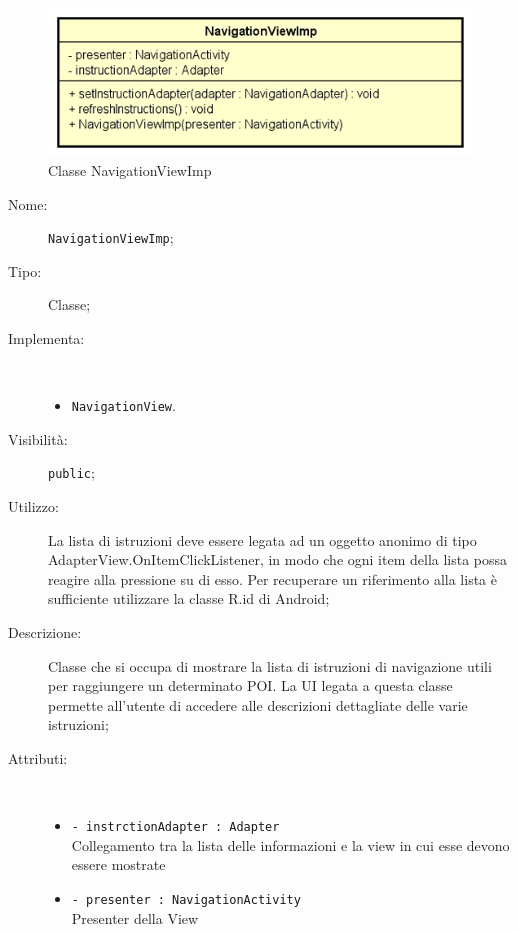 \documentclass[../DefinizioneDiProdotto.tex]{subfiles}
\begin{document}
    \begin{figure}[H]
        \centering
        \includegraphics{img/NavigationViewImp.png}
        \caption{Classe NavigationViewImp}\label{fig:view::NavigationViewImp} 
    \end{figure}
    \begin{description}
\item[Nome:] \texttt{NavigationViewImp};
\item[Tipo:] Classe;
\item[Implementa:] \
\begin{itemize}
\item \texttt{NavigationView}.

\end{itemize}
\item[Visibilità:] \texttt{public};
\item[Utilizzo:] La lista di istruzioni deve essere legata ad un oggetto anonimo di tipo AdapterView.OnItemClickListener, in modo che ogni item della lista possa reagire alla pressione su di esso. Per recuperare un riferimento alla lista è sufficiente utilizzare la classe R.id di Android;
\item[Descrizione:] Classe che si occupa di mostrare la lista di istruzioni di navigazione utili per raggiungere un determinato POI. La UI legata a questa classe permette all'utente di accedere alle descrizioni dettagliate delle varie istruzioni;
\item[Attributi:] \
\begin{itemize}
\item \texttt{- instrctionAdapter : Adapter}\\
Collegamento tra la lista delle informazioni e la view in cui esse devono essere mostrate

\item \texttt{- presenter : NavigationActivity}\\
Presenter della View


\end{itemize}
\end{description}
\end{document}
